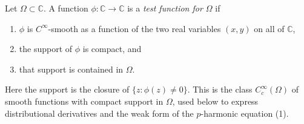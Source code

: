 \begin{definition}
Let $\Omega\subset\mathbb{C}$.  A function $\phi\colon\mathbb{C}\to\mathbb{C}$
is a \emph{test function for $\Omega$} if
\begin{enumerate}
\item[(a)] $\phi$ is $C^\infty$-smooth as a function of the two real variables
$(x,y)$ on all of $\mathbb{C}$,
\item[(b)] the support of $\phi$ is compact, and
\item[(c)] that support is contained in $\Omega$.
\end{enumerate}
Here the support is the closure of $\{z:\phi(z)\neq0\}$.  This is the class
$C^\infty_c(\Omega)$ of smooth functions with compact support in $\Omega$,
used below to express distributional derivatives and the weak form of the
$p$-harmonic equation (1).
\end{definition}
